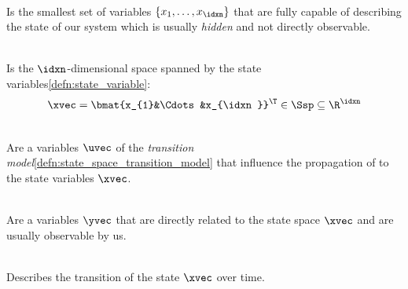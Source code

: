 \begin{defnbox}\nospacing
  \begin{defn}\label{defn:state_variables}\leavevmode\\
    Is the smallest set of variables $\left\{x_{1},\ldots,x_{\idxn}\right\}$ that
    are fully capable of describing the state of our system which is usually \textit{hidden}
    and not directly observable.
  \end{defn}
\end{defnbox}
\begin{defnbox}\nospacing
  \begin{defn}\label{defn:state_space}\leavevmode\\
    Is the $\idxn$-dimensional space spanned by the state variables\cref{defn:state_variable}:
    \begin{align}
      \xvec=\bmat{x_{1}&\Cdots&x_{\idxn}}^{\T}\in\Ssp\subseteq\R^{\idxn}
    \end{align}
  \end{defn}
\end{defnbox}
\begin{defnbox}\nospacing
  \begin{defn}\label{defn:output_variables_state_observations}\leavevmode\\
    Are a variables $\uvec$ of the \textit{transition model}\cref{defn:state_space_transition_model} that
    influence the propagation of to the state variables $\xvec$.
  \end{defn}
\end{defnbox}
\begin{defnbox}\nospacing
  \begin{defn}\label{defn:output_variables_state_observations}\leavevmode\\
    Are a variables $\yvec$ that are directly related to the state space $\xvec$ and are usually observable by us.
  \end{defn}
\end{defnbox}
\begin{defnbox}\nospacing
  \begin{defn}\label{defn:state_space_transition_model}\leavevmode\\
    Describes the transition of the state $\xvec$ over time.
  \end{defn}
\end{defnbox}
